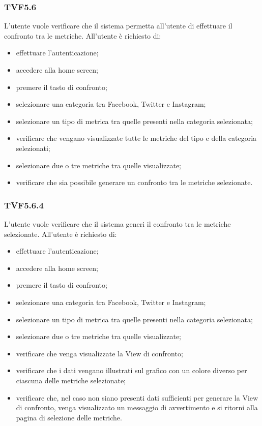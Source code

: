 		\subsubsection{TVF5.6}
			L'utente vuole verificare che il sistema permetta all'utente di effettuare il confronto tra le metriche. All'utente è richiesto di:
			\begin{itemize}
				\item effettuare l'autenticazione;
				\item accedere alla home screen;
				\item premere il tasto di confronto;
				\item selezionare una categoria tra Facebook, Twitter e Instagram;
				\item selezionare un tipo di metrica tra quelle presenti nella categoria selezionata;
				\item verificare che vengano visualizzate tutte le metriche del tipo e della categoria selezionati;
				\item selezionare due o tre metriche tra quelle visualizzate;
				\item verificare che sia possibile generare un confronto tra le metriche selezionate.
			\end{itemize}
			
		\subsubsection{TVF5.6.4}
			L'utente vuole verificare che il sistema generi il confronto tra le metriche selezionate. All'utente è richiesto di:
			\begin{itemize}
				\item effettuare l'autenticazione;
				\item accedere alla home screen;
				\item premere il tasto di confronto;
				\item selezionare una categoria tra Facebook, Twitter e Instagram;
				\item selezionare un tipo di metrica tra quelle presenti nella categoria selezionata;
				\item selezionare due o tre metriche tra quelle visualizzate;
				\item verificare che venga visualizzate la View di confronto;
				\item verificare che i dati vengano illustrati sul grafico con un colore diverso per ciascuna delle metriche selezionate;
				\item verificare che, nel caso non siano presenti dati sufficienti per generare la View di confronto, venga visualizzato un messaggio di avvertimento e si ritorni alla pagina di selezione delle metriche.
			\end{itemize}
			
